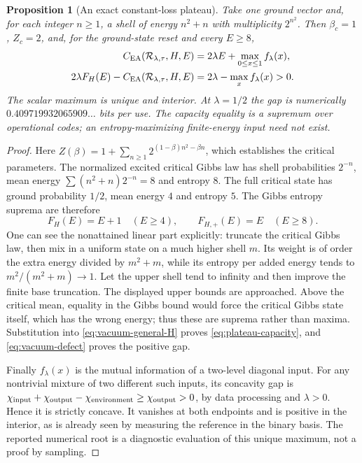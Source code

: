 \documentclass[11pt]{article}
\newtheorem{proposition}[theorem]{Proposition}
\newcommand{\Rcal}{\mathcal R_{\lambda,\tau}}
\begin{document}
\begin{proposition}[An exact constant-loss plateau]\label{prop:spectral-example}
Take one ground vector and, for each integer $n\ge1$, a shell of
energy $n^2+n$ with multiplicity $2^{n^2}$. Then
$\beta_c=1$, $Z_c=2$, and, for the ground-state reset and every $E\ge8$,
\begin{align}
 C_{\rm EA}(\Rcal,H,E)&=2\lambda E+\max_{0\le x\le1}f_\lambda(x),
       \label{eq:plateau-capacity}\\
 2\lambda F_H(E)-C_{\rm EA}(\Rcal,H,E)
       &=2\lambda-\max_x f_\lambda(x)>0.\label{eq:plateau-gap}
\end{align}
The scalar maximum is unique and interior. At $\lambda=1/2$ the
gap is numerically $0.409719932065909\ldots$ bits per use.
The capacity equality is a supremum over operational codes; an
entropy-maximizing finite-energy input need not exist.
\end{proposition}
\begin{proof}
Here
$Z(\beta)=1+\sum_{n\ge1}2^{(1-\beta)n^2-\beta n}$,
which establishes the critical parameters. The normalized excited
critical Gibbs law has shell probabilities $2^{-n}$, mean energy
$\sum(n^2+n)2^{-n}=8$ and entropy $8$. The full critical state
has ground probability $1/2$, mean energy $4$ and entropy $5$.
The Gibbs entropy suprema \cite[Proposition 1a]{shirokoventropy}
are therefore
\[
 F_H(E)=E+1\quad(E\ge4),\qquad
 F_{H,+}(E)=E\quad(E\ge8).
\]
One can see the nonattained linear part explicitly: truncate the
critical Gibbs law, then mix in a uniform state on a much higher
shell $m$. Its weight is of order the extra energy divided by
$m^2+m$, while its entropy per added energy tends to
$m^2/(m^2+m)\to1$. Let the upper shell tend to infinity and
then improve the finite base truncation. The displayed upper
bounds are approached. Above the critical mean, equality in the
Gibbs bound would force the critical Gibbs state itself, which
has the wrong energy; thus these are suprema rather than maxima.
Substitution into \eqref{eq:vacuum-general-H} proves
\eqref{eq:plateau-capacity}, and \eqref{eq:vacuum-defect} proves
the positive gap.

Finally $f_\lambda(x)$ is the mutual information of a two-level
diagonal input. For any nontrivial mixture of two different such
inputs, its concavity gap is
$\chi_{\rm input}+\chi_{\rm output}-\chi_{\rm environment}
\ge\chi_{\rm output}>0$, by data processing and $\lambda>0$.
Hence it is strictly concave. It vanishes at both endpoints and
is positive in the interior, as is already seen by measuring
the reference in the binary basis. The reported numerical root
is a diagnostic evaluation of this unique maximum, not a proof
by sampling.
\end{proof}
\end{document}
